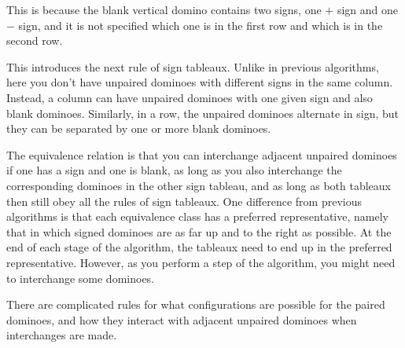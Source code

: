 \documentclass[12pt]{article}
\numberwithin{equation}{section}
\theoremstyle{definition}
\theoremstyle{remark}
\begin{document}
  This is because the blank vertical domino contains two signs, one $+$ sign and one $-$ sign, and it is not specified which one is in the first row and which is in the second row.

  This introduces the next rule of sign tableaux.
  Unlike in previous algorithms, here you don't have unpaired dominoes with different signs in the same column.
  Instead, a column can have unpaired dominoes with one given sign and also blank dominoes.
  Similarly, in a row, the unpaired dominoes alternate in sign, but they can be separated by one or more blank dominoes.

  The equivalence relation is that you can interchange adjacent unpaired dominoes if one has a sign and one is blank, as long as you also interchange the corresponding dominoes in the other sign tableau, and as long as both tableaux then still obey all the rules of sign tableaux.
  One difference from previous algorithms is that each equivalence class has a preferred representative, namely that in which signed dominoes are as far up and to the right as possible.
  At the end of each stage of the algorithm, the tableaux need to end up in the preferred representative.
  However, as you perform a step of the algorithm, you might need to interchange some dominoes.

  There are complicated rules for what configurations are possible for the paired dominoes, and how they interact with adjacent unpaired dominoes when interchanges are made.
\end{document}
